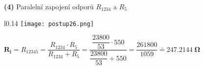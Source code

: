 \documentclass[a4paper,12pt]{article}
\begin{document}
\hspace{1em}\textbf{(4)} Paralelní zapojení odporů $R_{1234}$ a $R_5$\par\vspace{0.8em}
\begin{wrapfigure}{l}{0.14\textwidth}
\vspace{-55pt}
\texttt{[image: postup26.png]}
\vspace{-80pt}
\end{wrapfigure}
\vspace{20pt}
\hspace{1em}$\mathbf{R_i}=R_{12345}=\dfrac{R_{1234}\cdot R_5}{R_{1234}+R_5}=\dfrac{\dfrac{23800}{53}\cdot 550}{\dfrac{23800}{53}+550}=\dfrac{261800}{1059}\doteq \mathbf{ 247.2144 \;\si{\Omega}}$\par\vspace{3.5em}
\end{document}
